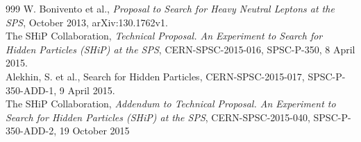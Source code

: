 \begin{thebibliography}{999}
W. Bonivento et al., \emph{Proposal to Search for Heavy Neutral Leptons at the
SPS}, October 2013, arXiv:130.1762v1.
\\
The SHiP Collaboration, \emph{Technical Proposal. An Experiment to Search for Hidden Particles (SHiP)
at the SPS}, CERN-SPSC-2015-016, SPSC-P-350, 8 April 2015.   
\\

Alekhin, S. et al., Search for Hidden Particles, 
  CERN-SPSC-2015-017, SPSC-P-350-ADD-1, 9 April 2015. 
\\

The SHiP Collaboration, \emph{Addendum to Technical Proposal. An Experiment to Search for Hidden Particles (SHiP)
at the SPS}, CERN-SPSC-2015-040, SPSC-P-350-ADD-2, 19 October 2015
\\


\end{thebibliography}

%





